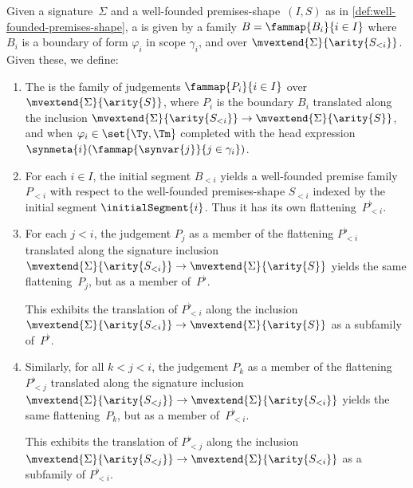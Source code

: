 \begin{definition}
  \label{def:well-founded-premise-family}%
  Given a signature~$\Sigma$ and a well-founded premises-shape~$(I, S)$ as in \cref{def:well-founded-premises-shape}, a  is given by
  a family $B = \fammap{B_i}{i \in I}$ where $B_i$ is a boundary of form $\varphi_i$ in scope $\gamma_i$, and over $\mvextend{\Sigma}{\arity{S_{<i}}}$.
  Given these, we define:
  \begin{enumerate}
  \item
    The  is the family of judgements $\fammap{P_i}{i \in I}$ over $\mvextend{\Sigma}{\arity{S}}$, where $P_i$ is the boundary $B_i$ translated along the inclusion $\mvextend{\Sigma}{\arity{S_{<i}}} \to \mvextend{\Sigma}{\arity{S}}$, and when $\varphi_i \in \set{\Ty, \Tm}$ completed with the head expression $\synmeta{i}(\fammap{\synvar{j}}{j \in \gamma_i})$.

  \item
    For each $i \in I$, the initial segment $B_{<i}$ yields a well-founded premise family $P_{<i}$ with respect to the well-founded premises-shape $S_{<i}$ indexed by the initial segment $\initialSegment{i}$. Thus it has its own flattening~$P_{<i}^\flat$.

  \item
    For each $j < i$, the judgement $P_j$ as a member of the flattening $P_{<i}^\flat$ translated along the signature inclusion $\mvextend{\Sigma}{\arity{S_{<i}}} \to \mvextend{\Sigma}{\arity{S}}$ yields the same flattening~$P_j$, but as a member of~$P^\flat$.

    This exhibits the translation of $P_{<i}^\flat$ along the inclusion $\mvextend{\Sigma}{\arity{S_{<i}}} \to \mvextend{\Sigma}{\arity{S}}$ as a subfamily of~$P^\flat$.

  \item
    Similarly, for all $k < j < i$, the judgement $P_k$ as a member of the flattening $P_{<j}^\flat$ translated along the signature inclusion $\mvextend{\Sigma}{\arity{S_{<j}}} \to \mvextend{\Sigma}{\arity{S_{<i}}}$ yields the same flattening~$P_k$, but as a member of~$P_{<i}^\flat$.

    This exhibits the translation of $P_{<j}^\flat$ along the inclusion $\mvextend{\Sigma}{\arity{S_{<j}}} \to \mvextend{\Sigma}{\arity{S_{<i}}}$ as a subfamily of $P_{<i}^\flat$.
  \end{enumerate}
\end{definition}

